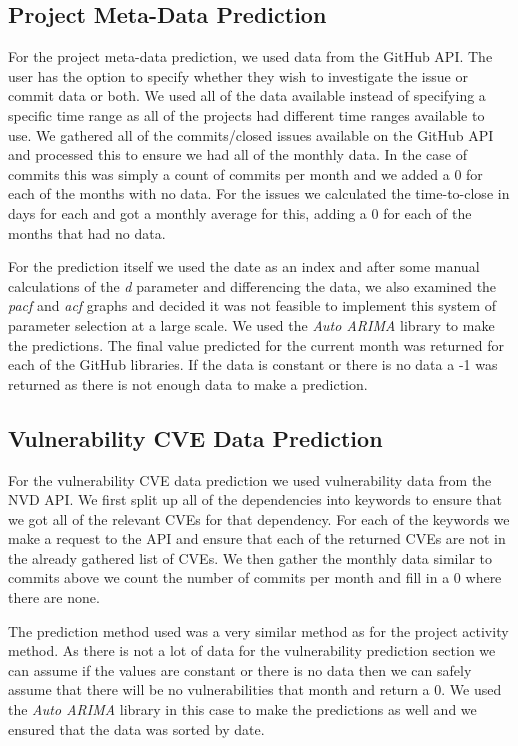 \documentclass[10pt, compsoc, conference]{IEEEtran}
\begin{document}
\subsection{Project Meta-Data Prediction}
For the project meta-data prediction, we used data from the GitHub API. The user has the option to specify whether they wish to investigate the issue or commit data or both. We used all of the data available instead of specifying a specific time range as all of the projects had different time ranges available to use. We gathered all of the commits/closed issues available on the GitHub API and processed this to ensure we had all of the monthly data. In the case of commits this was simply a count of commits per month and we added a 0 for each of the months with no data. For the issues we calculated the time-to-close in days for each and got a monthly average for this, adding a 0 for each of the months that had no data. 

For the prediction itself we used the date as an index and after some manual calculations of the \textit{d} parameter and differencing the data, we also examined the \textit{pacf} and \textit{acf} graphs and decided it was not feasible to implement this system of parameter selection at a large scale. We used the \textit{Auto ARIMA} library to make the predictions. The final value predicted for the current month was returned for each of the GitHub libraries. If the data is constant or there is no data a -1 was returned as there is not enough data to make a prediction. 

\subsection{Vulnerability CVE Data Prediction}
For the vulnerability CVE data prediction we used vulnerability data from the NVD API. We first split up all of the dependencies into keywords to ensure that we got all of the relevant CVEs for that dependency. For each of the keywords we make a request to the API and ensure that each of the returned CVEs are not in the already gathered list of CVEs. We then gather the monthly data similar to commits above we count the number of commits per month and fill in a 0 where there are none. 

The prediction method used was a very similar method as for the project activity method. As there is not a lot of data for the vulnerability prediction section we can assume if the values are constant or there is no data then we can safely assume that there will be no vulnerabilities that month and return a 0. We used the \textit{Auto ARIMA} library in this case to make the predictions as well and we ensured that the data was sorted by date. 
\end{document}
